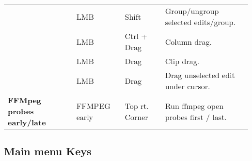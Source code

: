 \begin{longtable}[h]{>{\bfseries}p{}p{}p{}p{}}
  & LMB & Shift & Group/ungroup selected edits/group. \\
  & LMB & Ctrl + Drag & Column drag. \\
  & LMB & Drag & Clip drag. \\
  & LMB & Drag & Drag unselected edit under cursor. \\
  \midrule
  \textcolor{CinBlueText}{FFMpeg probes early/late} & FFMPEG early & Top rt. Corner & Run ffmpeg open probes first / last. \\
  \bottomrule
\end{longtable}


\subsection*{Main menu Keys}%
\label{sub:main_menu_keys}

